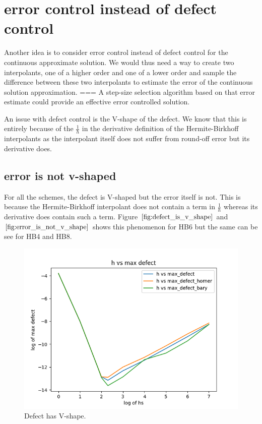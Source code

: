 \section{error control instead of defect control}
Another idea is to consider error control instead of defect control for the continuous approximate solution. We would thus need a way to create two interpolants, one of a higher order and one of a lower order and sample the difference between these two interpolants to estimate the error of the continuous solution approximation. 
=== A step-size selection algorithm based on that error estimate could provide an effective error controlled solution.

An issue with defect control is the V-shape of the defect. 
We know that this is entirely because of the $\frac{1}{h}$ in the derivative definition of the Hermite-Birkhoff interpolants as the interpolant itself does not suffer from round-off error but its derivative does.

\subsection{error is not v-shaped}
For all the schemes, the defect is V-shaped but the error itself is not. 
This is because the Hermite-Birkhoff interpolant does not contain a term in $\frac{1}{h}$ whereas its derivative does contain such a term. 
Figure $\ref{fig:defect_is_v_shape}$ and $\ref{fig:error_is_not_v_shape}$ shows this phenomenon for HB6 but the same can be see for HB4 and HB8. 

\begin{figure}[H]
\centering
\includegraphics[width=0.7\linewidth]{./figures/further_work_defect_is_v_shape_hb6}
\caption{Defect has V-shape.}
\label{fig:defect_is_v_shape}
\end{figure}

